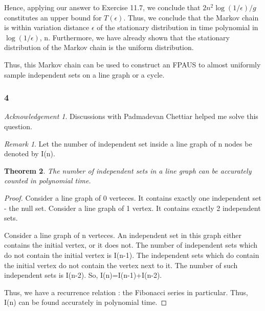 \documentclass[10pt]{amsart}
\newtheorem{thm}{Theorem}[subsection]
\theoremstyle{remark}
\newtheorem*{ack}{Acknowledgement}
\newtheorem{rem}[thm]{Remark}
\begin{document}
Hence, applying our answer to Exercise 11.7, we conclude that $2n^{2}\log (1/\epsilon)/g$ constitutes an upper bound for $T(\epsilon)$. Thus, we conclude that the Markov chain is within variation distance $\epsilon$ of the stationary distribution in time polynomial in $\log (1/\epsilon)$, n. Furthermore, we have already shown that the stationary distribution of the Markov chain is the uniform distribution.

Thus, this Markov chain can be used to construct an FPAUS to almost uniformly sample independent sets on a line graph or a cycle.

\subsubsection{4}

\begin{ack}
Discussions with Padmadevan Chettiar helped me solve this question.
\end{ack}

\begin{rem}
Let the number of independent set inside a line graph of n nodes be denoted by I(n).
\end{rem}

\begin{thm}
The number of independent sets in a line graph can be accurately counted in polynomial time.
\end{thm}
\begin{proof}
Consider a line graph of 0 verteces. It contains exactly one independent set - the null set. Consider a line graph of 1 vertex. It contains exactly 2 independent sets.

Consider a line graph of n verteces. An independent set in this graph either contains the initial vertex, or it does not. The number of independent sets which do not contain the initial vertex is I(n-1). The independent sets which do contain the initial vertex do not contain the vertex next to it. The number of such independent sets is I(n-2). So, I(n)=I(n-1)+I(n-2).

Thus, we have a recurrence relation : the Fibonacci series in particular. Thus, I(n) can be found accurately in polynomial time.

\end{proof}
\end{document}
